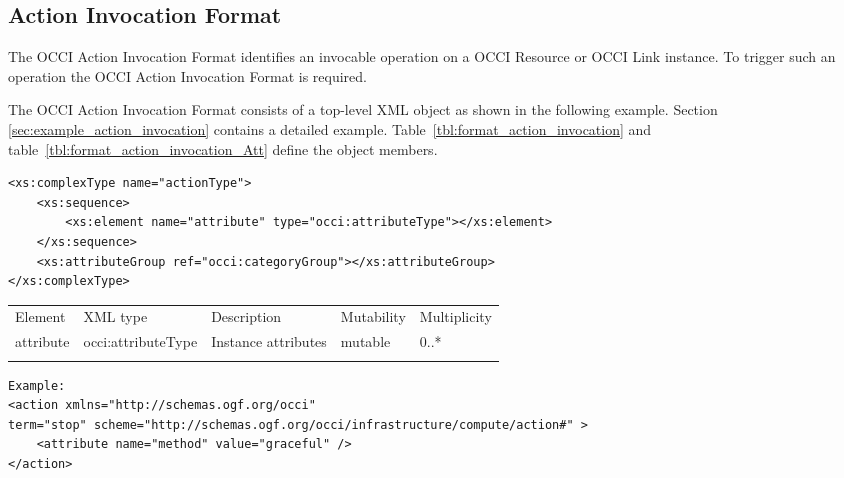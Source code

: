 \documentclass[10pt,a4paper]{article}
\begin{document}
\subsection{Action Invocation Format}
\label{sec:format_action_invocation}

The OCCI Action Invocation  Format identifies an invocable operation on a OCCI Resource or
OCCI Link instance. To trigger such an operation the OCCI Action Invocation
Format is required.

The OCCI Action Invocation Format consists of a top-level XML object as shown in the
following example. Section \ref{sec:example_action_invocation} contains a detailed example.
Table~\ref{tbl:format_action_invocation} and table~\ref{tbl:format_action_invocation_Att} define the object members.

\begin{lstlisting}
<xs:complexType name="actionType">
	<xs:sequence>
		<xs:element name="attribute" type="occi:attributeType"></xs:element>
	</xs:sequence>
	<xs:attributeGroup ref="occi:categoryGroup"></xs:attributeGroup>
</xs:complexType>
\end{lstlisting}

 {
    \begin{tabularx}{\textwidth}{llXll}
    \toprule
    Element & XML type & Description & Mutability & Multiplicity \\
    \colrule
    
    attribute & occi:attributeType & Instance attributes & mutable & 0..* \\
    \botrule
    \end{tabularx}
}
\FloatBarrier

\begin{lstlisting}
Example:
<action xmlns="http://schemas.ogf.org/occi"
term="stop" scheme="http://schemas.ogf.org/occi/infrastructure/compute/action#" >
	<attribute name="method" value="graceful" />
</action>
\end{lstlisting}
\end{document}
